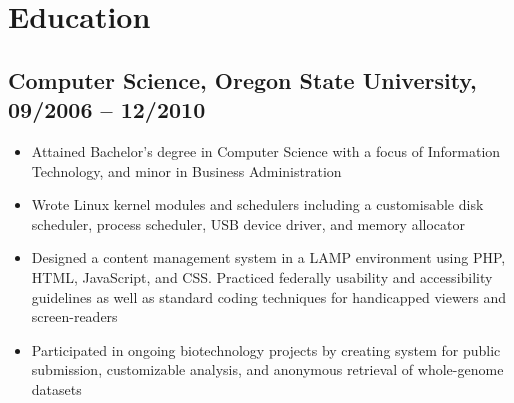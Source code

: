 \documentclass[a4paper,12pt]{report}
\begin{document}

\section*{Education}

\subsection*{Computer Science, Oregon State University, 09/2006 -- 12/2010}
\begin{itemize} \itemsep -0.25em
\item Attained Bachelor’s degree in Computer Science with a focus of Information Technology, and minor in Business Administration
\item Wrote Linux kernel modules and schedulers including a customisable disk scheduler, process scheduler, USB device driver, and memory allocator
\item Designed a content management system in a LAMP environment using PHP, HTML, JavaScript, and CSS. Practiced federally usability and accessibility guidelines as well as standard coding techniques for handicapped viewers and screen-readers
\item Participated in ongoing biotechnology projects by creating system for public submission, customizable analysis, and anonymous retrieval of whole-genome datasets

\end{itemize}
\end{document}
